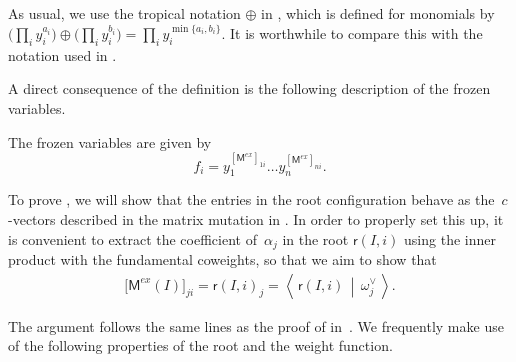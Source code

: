 \documentclass[ALCO,Unicode,ThmDefs]{cedram}
\newcommand{\Mex}{\sfM^{ex}}
\newcommand{\sfr}{\mathsf{r}}
\newcommand{\Root}[2]{{\sfr}(#1,#2)}
\newcommand{\dotprod}[2]{\left\langle \, #1 \,\middle|\, #2 \, \right\rangle}
\newcommand{\sfM}{\mathsf{M}}
\begin{document}
As usual, we use the tropical notation $\oplus$ in , which is defined for monomials by $\big(\prod_i y_i^{a_i}\big) \oplus \big(\prod_i y_i^{b_i}\big) = \prod_i y_i^{\min\{a_i,b_i\}}$. It is worthwhile to compare this with the notation used in .


A direct consequence of the definition is the following description of the frozen variables.

\begin{lemm}[{\cite[Eq.~(2.13)]{FZ2007}}]
The frozen variables are given by
\[
f_i = y_1^{[\Mex]_{1i}} \dots y_n^{[\Mex]_{ni}}.
\]
\end{lemm}

To prove , we will show that the entries in the root configuration behave as the~$c$-vectors described in the matrix mutation in . In order to properly set this up, it is convenient to extract the coefficient of~$\alpha_j$ in the root $\Root{I}{i}$ using the inner product with the fundamental coweights, so that we aim to show that
\begin{align}
\big[\Mex(I)\big]_{ji} = \Root{I}{i}_j = \dotprod{\Root{I}{i}}{\omega_j^\vee}. \label{eq:root_coefficient}
\end{align}


The argument follows the same lines as the proof of  in~\cite{PS2015}. We frequently make use of the following properties of the root and the weight function.
\end{document}
